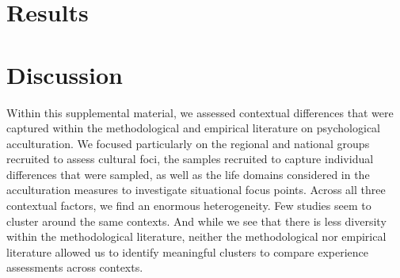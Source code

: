 \documentclass[man, 12pt, a4paper]{apa7}
\begin{document}
\section{Results}


\section{Discussion}
Within this supplemental material, we assessed contextual differences that were captured within the methodological and empirical literature on psychological acculturation. We focused particularly on the regional and national groups recruited to assess cultural foci, the samples recruited to capture individual differences that were sampled, as well as the life domains considered in the acculturation measures to investigate situational focus points. Across all three contextual factors, we find an enormous heterogeneity. Few studies seem to cluster around the same contexts. And while we see that there is less diversity within the methodological literature, neither the methodological nor empirical literature allowed us to identify meaningful clusters to compare experience assessments across contexts.

\printbibliography
\end{document}
